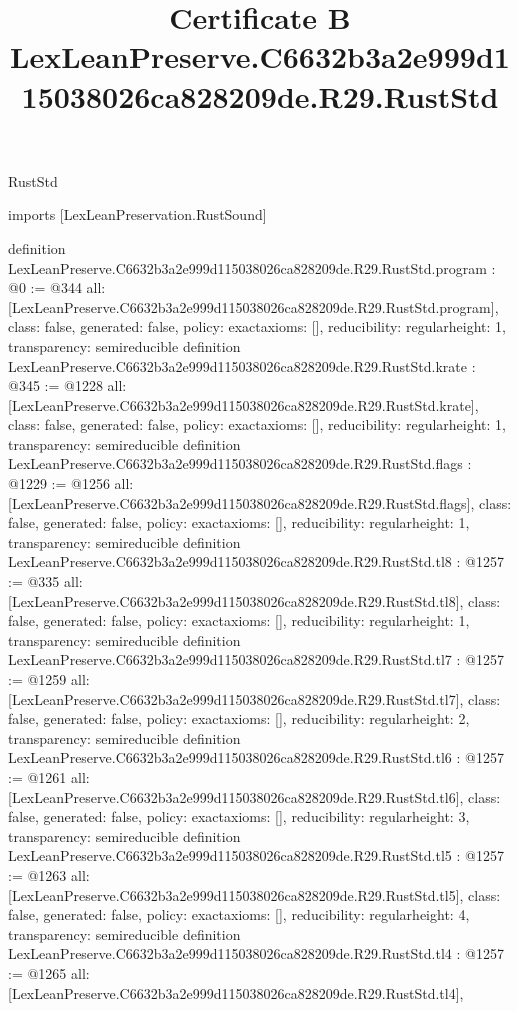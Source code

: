 \begin{lexlean}{RustStd}
\title{Certificate B LexLeanPreserve.C6632b3a2e999d115038026ca828209de.R29.RustStd}
\begin{coremodule}
imports [LexLeanPreservation.RustSound]

definition LexLeanPreserve.C6632b3a2e999d115038026ca828209de.R29.RustStd.program : @0 := @344 {
  all: [LexLeanPreserve.C6632b3a2e999d115038026ca828209de.R29.RustStd.program],
  class: false,
  generated: false,
  policy: exact{axioms: []},
  reducibility: regular{height: 1},
  transparency: semireducible
}
definition LexLeanPreserve.C6632b3a2e999d115038026ca828209de.R29.RustStd.krate : @345 := @1228 {
  all: [LexLeanPreserve.C6632b3a2e999d115038026ca828209de.R29.RustStd.krate],
  class: false,
  generated: false,
  policy: exact{axioms: []},
  reducibility: regular{height: 1},
  transparency: semireducible
}
definition LexLeanPreserve.C6632b3a2e999d115038026ca828209de.R29.RustStd.flags : @1229 := @1256 {
  all: [LexLeanPreserve.C6632b3a2e999d115038026ca828209de.R29.RustStd.flags],
  class: false,
  generated: false,
  policy: exact{axioms: []},
  reducibility: regular{height: 1},
  transparency: semireducible
}
definition LexLeanPreserve.C6632b3a2e999d115038026ca828209de.R29.RustStd.tl8 : @1257 := @335 {
  all: [LexLeanPreserve.C6632b3a2e999d115038026ca828209de.R29.RustStd.tl8],
  class: false,
  generated: false,
  policy: exact{axioms: []},
  reducibility: regular{height: 1},
  transparency: semireducible
}
definition LexLeanPreserve.C6632b3a2e999d115038026ca828209de.R29.RustStd.tl7 : @1257 := @1259 {
  all: [LexLeanPreserve.C6632b3a2e999d115038026ca828209de.R29.RustStd.tl7],
  class: false,
  generated: false,
  policy: exact{axioms: []},
  reducibility: regular{height: 2},
  transparency: semireducible
}
definition LexLeanPreserve.C6632b3a2e999d115038026ca828209de.R29.RustStd.tl6 : @1257 := @1261 {
  all: [LexLeanPreserve.C6632b3a2e999d115038026ca828209de.R29.RustStd.tl6],
  class: false,
  generated: false,
  policy: exact{axioms: []},
  reducibility: regular{height: 3},
  transparency: semireducible
}
definition LexLeanPreserve.C6632b3a2e999d115038026ca828209de.R29.RustStd.tl5 : @1257 := @1263 {
  all: [LexLeanPreserve.C6632b3a2e999d115038026ca828209de.R29.RustStd.tl5],
  class: false,
  generated: false,
  policy: exact{axioms: []},
  reducibility: regular{height: 4},
  transparency: semireducible
}
definition LexLeanPreserve.C6632b3a2e999d115038026ca828209de.R29.RustStd.tl4 : @1257 := @1265 {
  all: [LexLeanPreserve.C6632b3a2e999d115038026ca828209de.R29.RustStd.tl4],
}
\end{coremodule}
\end{lexlean}
